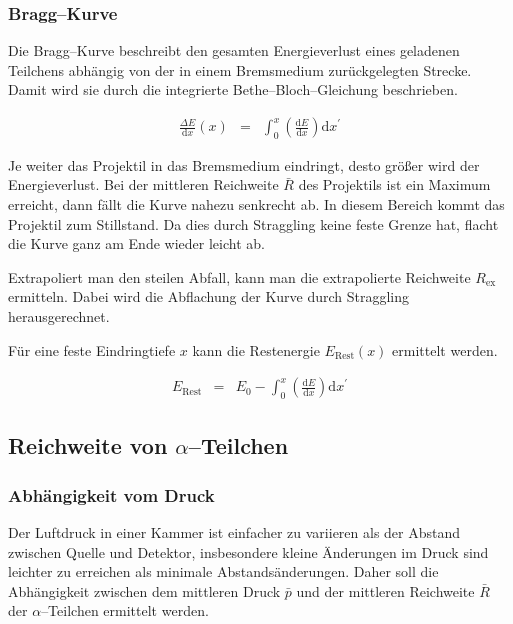 \documentclass[12pt,a4paper]{scrartcl}
\numberwithin{equation}{section} %
\begin{document}
\hypertarget{bragg-kurve}{%
\subsubsection{Bragg--Kurve}\label{bragg-kurve}}

Die Bragg--Kurve beschreibt den gesamten Energieverlust eines geladenen Teilchens abhängig von der in einem Bremsmedium zurückgelegten Strecke. Damit wird sie durch die integrierte Bethe--Bloch--Gleichung beschrieben.

\begin{eqnarray}
    \frac{\Delta E}{\mathrm dx}(x) &=&
        \int_0^x \left(\frac{\mathrm dE}{\mathrm dx}\right) \mathrm dx^\prime
\end{eqnarray}

\noindent
Je weiter das Projektil in das Bremsmedium eindringt, desto größer wird der Energieverlust. Bei der mittleren Reichweite $\bar R$ des Projektils ist ein Maximum erreicht, dann fällt die Kurve nahezu senkrecht ab. In diesem Bereich kommt das Projektil zum Stillstand. Da dies durch Straggling keine feste Grenze hat, flacht die Kurve ganz am Ende wieder leicht ab.

Extrapoliert man den steilen Abfall, kann man die extrapolierte Reichweite $R_\mathrm{ex}$ ermitteln. Dabei wird die Abflachung der Kurve durch Straggling herausgerechnet.

Für eine feste Eindringtiefe $x$ kann die Restenergie $E_\mathrm{Rest}(x)$ ermittelt werden.

\begin{eqnarray}
    E_\mathrm{Rest}
        &=& E_0
        - \int_0^x \left(\frac{\mathrm dE}{\mathrm dx}\right) \mathrm dx^\prime
        \label{Restenergie}
\end{eqnarray}

\hypertarget{reichweite-von-alpha-teilchen}{%
\subsection{Reichweite von $\alpha$--Teilchen}\label{reichweite-von-alpha-teilchen}}

\hypertarget{abhuxe4ngigkeit-vom-druck}{%
\subsubsection{Abhängigkeit vom Druck}\label{abhuxe4ngigkeit-vom-druck}}

Der Luftdruck in einer Kammer ist einfacher zu variieren als der Abstand zwischen Quelle und Detektor, insbesondere kleine Änderungen im Druck sind leichter zu erreichen als minimale Abstandsänderungen. Daher soll die Abhängigkeit zwischen dem mittleren Druck $\bar p$ und der mittleren Reichweite $\bar R$ der $\alpha$--Teilchen ermittelt werden.
\end{document}
